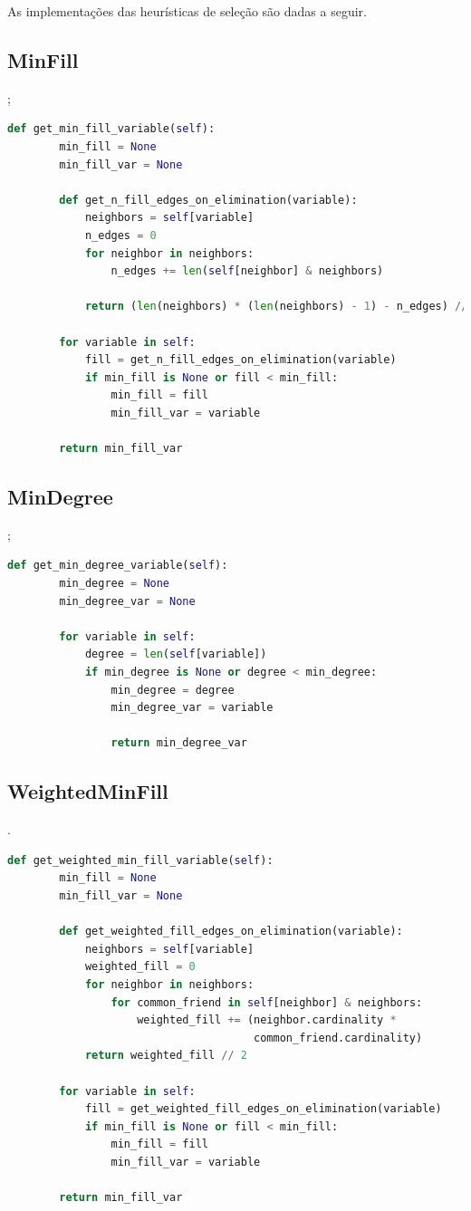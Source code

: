 \documentclass[paper=a4, fontsize=11pt]{scrartcl} %
\numberwithin{equation}{subsection}
\numberwithin{figure}{subsection}
\numberwithin{table}{subsection}
\numberwithin{definition}{subsection}
\numberwithin{theorem}{subsection}
\numberwithin{property}{subsection}
\numberwithin{proposition}{subsection}
\numberwithin{equation}{section}
\numberwithin{figure}{section}
\numberwithin{table}{section}
\numberwithin{definition}{section}
\numberwithin{theorem}{section}
\numberwithin{property}{section}
\numberwithin{proposition}{section}
\begin{document}
As implementações das heurísticas de seleção são dadas a seguir.

\subsection{MinFill};

\begin{lstlisting}[language=python]
    def get_min_fill_variable(self):
        min_fill = None
        min_fill_var = None

        def get_n_fill_edges_on_elimination(variable):
            neighbors = self[variable]
            n_edges = 0
            for neighbor in neighbors:
                n_edges += len(self[neighbor] & neighbors)

            return (len(neighbors) * (len(neighbors) - 1) - n_edges) // 2

        for variable in self:
            fill = get_n_fill_edges_on_elimination(variable)
            if min_fill is None or fill < min_fill:
                min_fill = fill
                min_fill_var = variable

        return min_fill_var
\end{lstlisting}

\subsection{MinDegree};

\begin{lstlisting}[language=python]
    def get_min_degree_variable(self):
        min_degree = None
        min_degree_var = None

        for variable in self:
            degree = len(self[variable])
            if min_degree is None or degree < min_degree:
                min_degree = degree
                min_degree_var = variable

                return min_degree_var
\end{lstlisting}

\subsection{WeightedMinFill}.

\FloatBarrier
\begin{lstlisting}[language=python]
    def get_weighted_min_fill_variable(self):
        min_fill = None
        min_fill_var = None

        def get_weighted_fill_edges_on_elimination(variable):
            neighbors = self[variable]
            weighted_fill = 0
            for neighbor in neighbors:
                for common_friend in self[neighbor] & neighbors:
                    weighted_fill += (neighbor.cardinality *
                                      common_friend.cardinality)
            return weighted_fill // 2

        for variable in self:
            fill = get_weighted_fill_edges_on_elimination(variable)
            if min_fill is None or fill < min_fill:
                min_fill = fill
                min_fill_var = variable

        return min_fill_var
\end{lstlisting}
\end{document}
